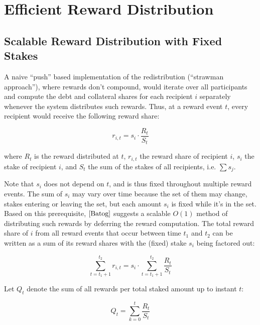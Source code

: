 \documentclass[reqno]{article}
\begin{document}
\section{Efficient Reward Distribution}

\subsection{Scalable Reward Distribution with Fixed Stakes} \label{sec:strawman}

A naive “push” based implementation of the redistribution (“strawman approach”), where rewards don’t compound, would iterate over all participants and compute the debt and collateral shares  for each recipient $i$ separately whenever the system distributes such rewards. Thus, at a reward event $t$, every recipient would receive the following reward share:

\begin{equation} 
    r_{i,t}=s_i \cdot \frac{R_t}{S_t}
\end{equation}

where $R_t$ is the reward distributed at $t$, $r_{i,t}$ the reward share of recipient $i$, $s_i$ the stake of recipient $i$, and $S_t$ the sum of the stakes of all recipients, i.e. $\sum s_j$.

Note that $s_i$ does not depend on $t$, and is thus fixed throughout multiple reward events. The sum of $s_i$ may vary over time because the set of them may change, stakes entering or leaving the set, but each amount $s_i$ is fixed while it’s in the set. \\

Based on this prerequisite, $\cite{Batog}$ suggests a scalable $O(1)$ method of distributing such rewards by deferring the reward computation. The total reward share of $i$ from all reward events that occur between time $t_1$ and $t_2$ can be written as a sum of its reward shares with the (fixed) stake $s_i$ being factored out:

\begin{equation}
    \sum\limits_{t=t_1+1}^{t_2} r_{i,t} = s_i \cdot \sum\limits_{t=t_1+1}^{t_2}\frac{R_t}{S_t}
\end{equation}

Let $Q_t$ denote the sum of all rewards per total staked amount up to instant $t$:

\begin{equation}
   Q_t = \sum\limits_{k=0}^{t}\frac{R_t}{S_t}
\end{equation}
\end{document}
